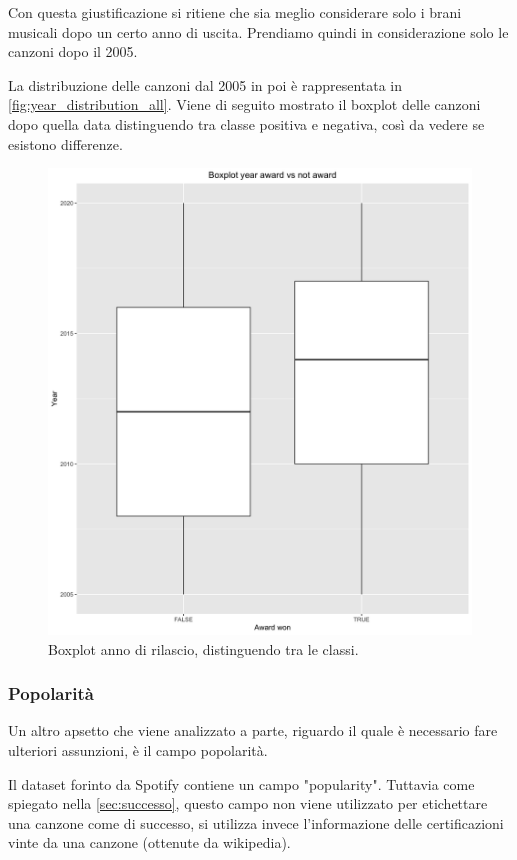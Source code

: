 Con questa giustificazione si ritiene che sia meglio considerare solo i brani musicali dopo un certo anno di uscita. Prendiamo quindi in considerazione solo le canzoni dopo il 2005.

La distribuzione delle canzoni dal 2005 in poi è rappresentata in \autoref{fig:year_distribution_all}. Viene di seguito mostrato il boxplot delle canzoni dopo quella data distinguendo tra classe positiva e negativa, così da vedere se esistono differenze.

 \begin{figure}[H]
 	\centering
 	\includegraphics[width=13cm]{../images/year_award_comparison.png}
 	\caption{Boxplot anno di rilascio, distinguendo tra le classi.}
 	\label{fig:year_boxplot_award}
 \end{figure}
 
\subsubsection{Popolarità}
\label{sec:popularity}
Un altro apsetto che viene analizzato a parte, riguardo il quale è necessario fare ulteriori assunzioni, è il campo popolarità.

Il dataset forinto da Spotify contiene un campo "popularity". Tuttavia come spiegato nella \autoref{sec:successo}, questo campo non viene utilizzato per etichettare una canzone come di successo, si utilizza invece l'informazione delle certificazioni vinte da una canzone (ottenute da wikipedia).

